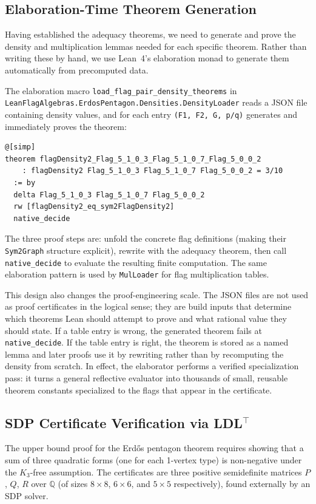 \documentclass{article}
\newcommand{\Q}{\mathbb{Q}}
\newcommand{\lean}[1]{\texttt{#1}}
\begin{document}
\subsection{Elaboration-Time Theorem Generation}

Having established the adequacy theorems, we need to generate and prove the
density and multiplication lemmas needed for each specific theorem.  Rather
than writing these by hand, we use Lean~4's elaboration monad to generate them
automatically from precomputed data.

The elaboration macro \lean{load\_flag\_pair\_density\_theorems} in
\lean{LeanFlagAlgebras.ErdosPentagon.Densities.DensityLoader} reads a JSON
file containing density values, and for each entry \lean{(F1, F2, G, p/q)}
generates and immediately proves the theorem:
\begin{lstlisting}
@[simp]
theorem flagDensity2_Flag_5_1_0_3_Flag_5_1_0_7_Flag_5_0_0_2
    : flagDensity2 Flag_5_1_0_3 Flag_5_1_0_7 Flag_5_0_0_2 = 3/10
  := by
  delta Flag_5_1_0_3 Flag_5_1_0_7 Flag_5_0_0_2
  rw [flagDensity2_eq_sym2FlagDensity2]
  native_decide
\end{lstlisting}
The three proof steps are: unfold the concrete flag definitions (making their
\lean{Sym2Graph} structure explicit), rewrite with the adequacy theorem, then
call \lean{native\_decide} to evaluate the resulting finite computation.
The same elaboration pattern is used by \lean{MulLoader} for flag multiplication tables.

This design also changes the proof-engineering scale.  The JSON files are not
used as proof certificates in the logical sense; they are build inputs that
determine which theorems Lean should attempt to prove and what rational value
they should state.  If a table entry is wrong, the generated theorem fails at
\lean{native\_decide}.  If the table entry is right, the theorem is stored as a
named lemma and later proofs use it by rewriting rather than by recomputing the
density from scratch.  In effect, the elaborator performs a verified
specialization pass: it turns a general reflective evaluator into thousands of
small, reusable theorem constants specialized to the flags that appear in the
certificate.

\subsection{SDP Certificate Verification via \texorpdfstring{LDL$^\top$}{LDL\string^T}}
\label{sec:sdp}

The upper bound proof for the Erd\H{o}s pentagon theorem requires showing
that a sum of three quadratic forms (one for each 1-vertex type) is
non-negative under the $K_3$-free assumption.  The certificates are three
positive semidefinite matrices $P$, $Q$, $R$ over $\Q$ (of sizes
$8 \times 8$, $6 \times 6$, and $5 \times 5$ respectively),
found externally by an SDP solver.
\end{document}
